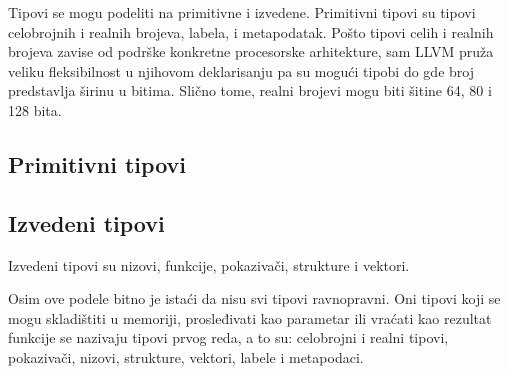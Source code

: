 Tipovi se mogu podeliti na primitivne i izvedene. 
Primitivni tipovi su tipovi celobrojnih i realnih brojeva, labela, i metapodatak.
Pošto tipovi celih i realnih brojeva zavise od podrške konkretne procesorske arhitekture,
sam LLVM pruža veliku fleksibilnost u njihovom deklarisanju
pa su mogući tipobi  do  gde broj predstavlja širinu u bitima.
Slično tome, realni brojevi mogu biti šitine 64, 80 i 128 bita.

\subsection*{Primitivni tipovi}

\subsection*{Izvedeni tipovi}

Izvedeni tipovi su nizovi, funkcije, pokazivači, strukture i vektori.

Osim ove podele bitno je istaći da nisu svi tipovi ravnopravni.
Oni tipovi koji se mogu skladištiti u memoriji, prosleđivati kao parametar ili vraćati kao rezultat funkcije se nazivaju tipovi prvog reda, a to su: celobrojni i realni tipovi, pokazivači, nizovi, strukture, vektori, labele i metapodaci.


